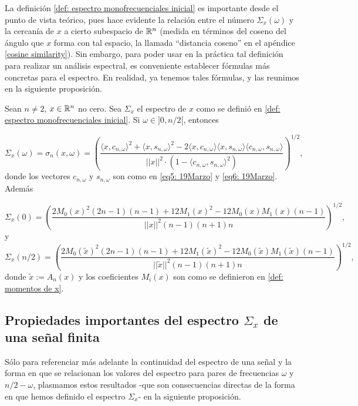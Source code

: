 La definición \ref{def: espectro monofrecuenciales inicial}
es importante desde el punto de vista teórico, pues 
hace evidente la relación entre el número
$\Sigma_{x}(\omega)$ y la cercanía de $x$ a cierto subespacio
de $\mathbb{R}^{n}$ (medida en términos del coseno del ángulo
que $x$ forma con tal espacio, la llamada
``distancia coseno'' en el apéndice \ref{cosine similarity}). 
Sin embargo, para 
poder usar en la práctica tal definición para realizar
un análisis espectral, es conveniente establecer fórmulas
más concretas para el espectro. En realidad, ya tenemos tales
fórmulas, y las reunimos en la siguiente proposición.
\begin{prop}
\label{prop: formula explicita espectro}
Sean $n \neq 2$, $x \in \mathbb{R}^{n}$ no cero.
Sea $\Sigma_{x}$ el espectro de $x$ como se definió en 
\ref{def: espectro monofrecuenciales inicial}.
Si $\omega \in ]0, n/2[$, entonces

\[
\Sigma_{x}(\omega) = 
\sigma_{n}(x, \omega) =
	\left(		  
		  \frac{\langle x, c_{n, \omega } \rangle^{2} +  \langle x, s_{n, \omega } \rangle^{2}	
	       -2  \langle x, c_{n, \omega } \rangle \langle x, s_{n, \omega } \rangle \langle c_{n, \omega }, s_{n, \omega } \rangle}{ || x ||^{2} \cdot
	       (1- \langle c_{n, \omega }, s_{n, \omega } \rangle^{2})}	  
\right) ^{1/2},
\]
donde los vectores $c_{n, \omega}$ y $s_{n, \omega}$
son como en \eqref{eq5: 19Marzo} y \eqref{eq6: 19Marzo}.
Además

\[
\Sigma_{x}(0) = 
\left(
\frac{
2M_{0}(x)^{2}(2n-1)(n-1) + 12M_{1}(x)^{2} - 12M_{0}(x)M_{1}(x)(n-1)
}{
||x||^{2} (n-1)(n+1)n}
\right)^{1/2},
\]
y
\[
\Sigma_{x}(n/2) = 
\left(
\frac{
2M_{0}(\tilde{x})^{2}(2n-1)(n-1) + 12
M_{1}(\tilde{x})^{2} - 12 M_{0}(\tilde{x}) M_{1}(\tilde{x})(n-1)
}{
||\tilde{x}||^{2} (n-1)(n+1)n}
\right)^{1/2},
\]
donde $\tilde{x} := A_{n}(x)$ y
los coeficientes $M_{i}(x)$ 
son como se definieron en 
\ref{def: momentos de x}. 
\end{prop}

\subsection{Propiedades importantes del espectro $\Sigma_{x}$ de una señal finita}
Sólo para referenciar más adelante 
la continuidad del espectro de una 
señal y la forma en que se relacionan los valores
del espectro para pares de frecuencias $\omega$ y $n/2-\omega$,
plasmamos estos resultados 
-que son consecuencias directas de la forma en que hemos
definido el espectro $\Sigma_{x}$-
en la siguiente proposición.


